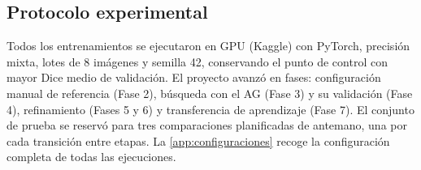 \subsection{Protocolo experimental}\label{subsec:protocolo}

Todos los entrenamientos se ejecutaron en GPU (Kaggle) con PyTorch, precisión mixta, lotes de 8 imágenes y semilla 42, conservando el punto de control con mayor Dice medio de validación. El proyecto avanzó en fases: configuración manual de referencia (Fase 2), búsqueda con el AG (Fase 3) y su validación (Fase 4), refinamiento (Fases 5 y 6) y transferencia de aprendizaje (Fase 7). El conjunto de prueba se reservó para tres comparaciones planificadas de antemano, una por cada transición entre etapas. La \cref{app:configuraciones} recoge la configuración completa de todas las ejecuciones.
